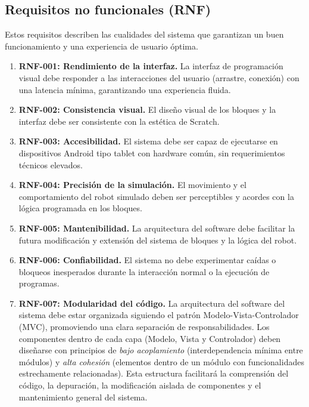 \subsection{Requisitos no funcionales (RNF)}
Estos requisitos describen las cualidades del sistema que garantizan un buen funcionamiento y una experiencia de usuario óptima.
\begin{enumerate}
	\item \textbf{RNF-001: Rendimiento de la interfaz.} La interfaz de programación visual debe responder a las interacciones del usuario (arrastre, conexión) con una latencia mínima, garantizando una experiencia fluida.
	\\
	\item \textbf{RNF-002: Consistencia visual.} El diseño visual de los bloques y la interfaz debe ser consistente con la estética de Scratch. 
	\\
	\item \textbf{RNF-003: Accesibilidad.} El sistema debe ser capaz de ejecutarse en dispositivos Android tipo tablet con hardware común, sin requerimientos técnicos elevados. 
	\\
	\item \textbf{RNF-004: Precisión de la simulación.} El movimiento y el comportamiento del robot simulado deben ser perceptibles y acordes con la lógica programada en los bloques. 
	\\
	\item \textbf{RNF-005: Mantenibilidad.} La arquitectura del software debe facilitar la futura modificación y extensión del sistema de bloques y la lógica del robot.
	\\
	\item \textbf{RNF-006: Confiabilidad.} El sistema no debe experimentar caídas o bloqueos inesperados durante la interacción normal o la ejecución de programas.
	\\
	\item \textbf{RNF-007: Modularidad del código.}
	La arquitectura del software del sistema debe estar organizada siguiendo el patrón Modelo-Vista-Controlador (MVC), promoviendo una clara separación de responsabilidades. Los componentes dentro de cada capa (Modelo, Vista y Controlador) deben diseñarse con principios de \textit{bajo acoplamiento} (interdependencia mínima entre módulos) y \textit{alta cohesión} (elementos dentro de un módulo con funcionalidades estrechamente relacionadas). Esta estructura facilitará la comprensión del código, la depuración, la modificación aislada de componentes y el mantenimiento general del sistema.

\end{enumerate}
